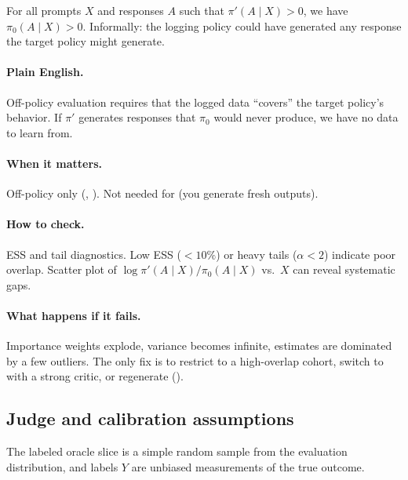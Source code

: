 \begin{assumption}
\label{assum:overlap}
For all prompts $X$ and responses $A$ such that $\pi'(A \mid X) > 0$, we have $\pi_0(A \mid X) > 0$. Informally: the logging policy could have generated any response the target policy might generate.
\end{assumption}

\paragraph{Plain English.} Off-policy evaluation requires that the logged data ``covers'' the target policy's behavior. If $\pi'$ generates responses that $\pi_0$ would never produce, we have no data to learn from.

\paragraph{When it matters.} Off-policy only (\ips, \dr). Not needed for \dm{} (you generate fresh outputs).

\paragraph{How to check.} ESS and tail diagnostics. Low ESS ($< 10\%$) or heavy tails ($\alpha < 2$) indicate poor overlap. Scatter plot of $\log \pi'(A \mid X) / \pi_0(A \mid X)$ vs.\ $X$ can reveal systematic gaps.

\paragraph{What happens if it fails.} Importance weights explode, variance becomes infinite, estimates are dominated by a few outliers. The only fix is to restrict to a high-overlap cohort, switch to \dr{} with a strong critic, or regenerate (\dm).

\subsection{Judge and calibration assumptions}

\begin{assumption}
\label{assum:oracle}
The labeled oracle slice is a simple random sample from the evaluation distribution, and labels $Y$ are unbiased measurements of the true outcome.
\end{assumption}

